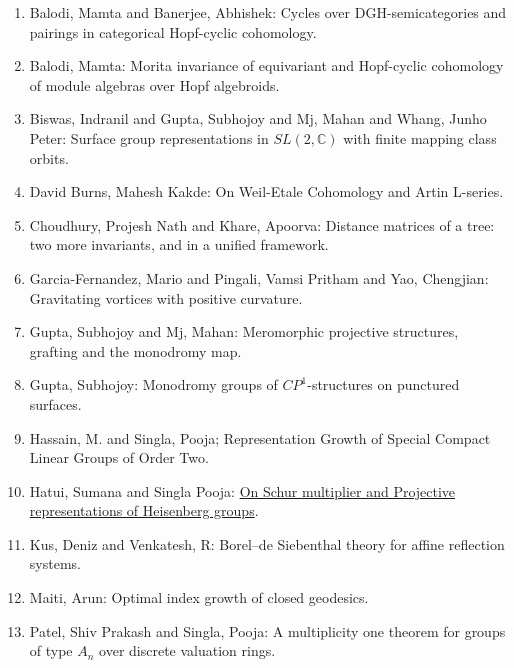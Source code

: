 \begin{enumerate}[resume, leftmargin=27pt]

	\item Balodi, Mamta and Banerjee, Abhishek: Cycles over DGH-semicategories and pairings in categorical Hopf-cyclic cohomology.

	\item Balodi, Mamta: Morita invariance of equivariant and Hopf-cyclic cohomology of module algebras over Hopf algebroids.

	\item Biswas, Indranil and Gupta, Subhojoy and Mj, Mahan and Whang, Junho Peter: Surface group representations in $SL(2,\mathbb{C})$ with finite mapping class orbits.

	\item David Burns, Mahesh Kakde: On Weil-Etale Cohomology and Artin L-series.
	
	\item\label{khare:matrices-tree}  Choudhury, Projesh Nath and Khare, Apoorva: Distance matrices of a tree: two
	      more invariants, and in a unified framework.
	\item Garcia-Fernandez, Mario and Pingali, Vamsi Pritham and Yao, Chengjian: Gravitating vortices with positive curvature.

	\item Gupta, Subhojoy and Mj, Mahan: Meromorphic projective structures, grafting and the monodromy map.

	\item Gupta, Subhojoy: Monodromy groups of $CP^1$-structures on punctured surfaces.

	\item\label{singla:compact-linear-groups} Hassain, M. and Singla, Pooja; Representation Growth of Special Compact Linear Groups of Order Two.

	\item Hatui, Sumana and Singla Pooja: \href{https://arxiv.org/abs/1909.06589}{On Schur multiplier and Projective representations of Heisenberg groups}.

	\item Kus, Deniz and Venkatesh, R: Borel--de Siebenthal theory for affine reflection systems.

	\item Maiti, Arun: Optimal index growth of closed geodesics.

	\item\label{singla:discrete-valuation-rings} Patel, Shiv Prakash and Singla, Pooja: A multiplicity one theorem for groups of type $A_n$ over discrete valuation rings.


\end{enumerate}
